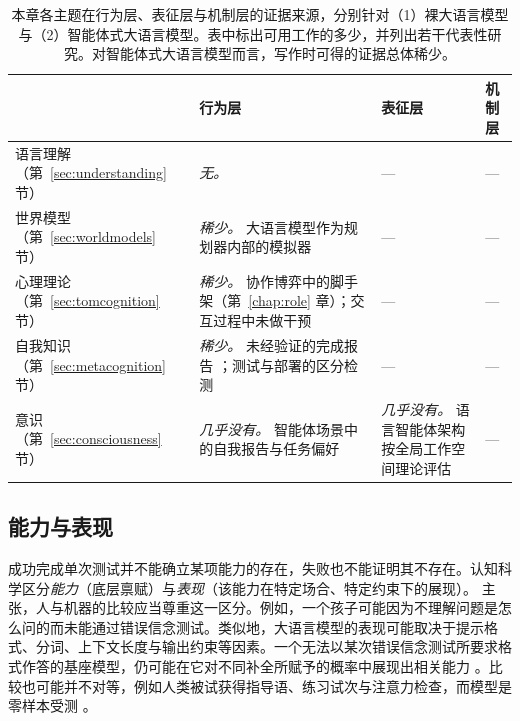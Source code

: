 \begin{table}
\begin{subtable}{\textwidth}
\begin{tabularx}{\linewidth}{@{}p{2.1cm}XXX@{}}
\toprule
 & \textbf{行为层} & \textbf{表征层} & \textbf{机制层} \\
\midrule
语言理解（第~\ref{sec:understanding} 节） &
\emph{无。} &
--- &
--- \\
\addlinespace
世界模型（第~\ref{sec:worldmodels} 节） &
\emph{稀少。} 大语言模型作为规划器内部的模拟器 \citep{hao2023reasoning,gu2024your} &
--- &
--- \\
\addlinespace
心理理论（第~\ref{sec:tomcognition} 节） &
\emph{稀少。} 协作博弈中的脚手架（第~\ref{chap:role} 章）；交互过程中未做干预 &
--- &
--- \\
\addlinespace
自我知识（第~\ref{sec:metacognition} 节） &
\emph{稀少。} 未经验证的完成报告 \citep{shapira2026agentschaos}；测试与部署的区分检测 \citep{needham2025large} &
--- &
--- \\
\addlinespace
意识（第~\ref{sec:consciousness} 节） &
\emph{几乎没有。} 智能体场景中的自我报告与任务偏好 \citep{gray2025agentic} &
\emph{几乎没有。} 语言智能体架构按全局工作空间理论评估 \citep{goldstein2024case} &
--- \\
\bottomrule
\end{tabularx}
\caption{智能体式大语言模型（在交互中研究）}\label{tab:levels-agentic}
\end{subtable}

\caption{本章各主题在行为层、表征层与机制层的证据来源，分别针对（1）裸大语言模型与（2）智能体式大语言模型。表中标出可用工作的多少，并列出若干代表性研究。对智能体式大语言模型而言，写作时可得的证据总体稀少。}\label{tab:levels}
\end{table}
 
\subsection{能力与表现} \label{sec:competence}
成功完成单次测试并不能确立某项能力的存在，失败也不能证明其不存在。认知科学区分\emph{能力}（底层禀赋）与\emph{表现}（该能力在特定场合、特定约束下的展现）\citep{chomsky1965aspects}。\citet{firestone2020perf} 主张，人与机器的比较应当尊重这一区分。例如，一个孩子可能因为不理解问题是怎么问的而未能通过错误信念测试。类似地，大语言模型的表现可能取决于提示格式、分词、上下文长度与输出约束等因素。一个无法以某次错误信念测试所要求格式作答的基座模型，仍可能在它对不同补全所赋予的概率中展现出相关能力 \citep{kouwenhoven2026traces}。比较也可能并不对等，例如人类被试获得指导语、练习试次与注意力检查，而模型是零样本受测 \citep{lampinen2024can}。

